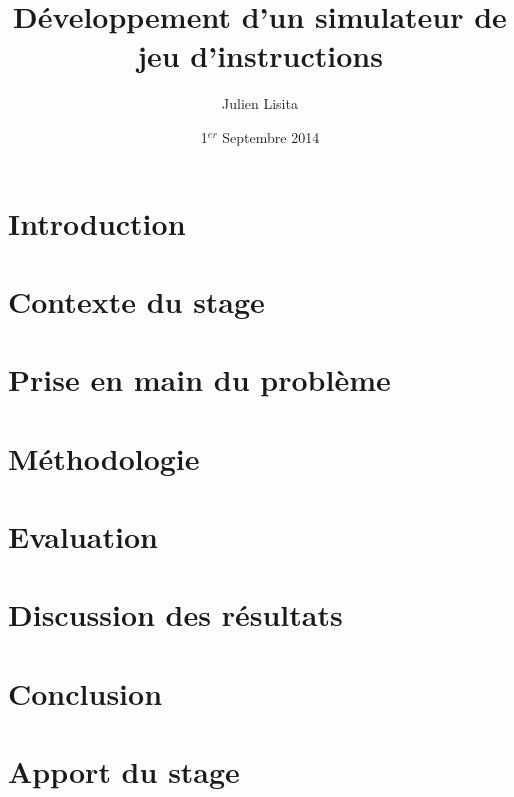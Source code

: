 \documentclass[a4paper,11pt,onecolumn]{mathese}
\begin{document}
\setlength{\parskip}{0.5em}%
\baselineskip 14pt


\title{\bf \huge Développement d'un simulateur de jeu d'instructions}
\author{Julien Lisita}
\date{1$^{er}$ Septembre 2014}

\begin{titlepage}
\begin{figure}
\begin{center}
\maketitle
\end{center}
\end{figure}
\end{titlepage}
%
%


\tableofcontents {}
\listoffigures

\mainmatter

\chapter{Introduction}
\label{introduction}

\chapter{Contexte du stage}
\chapter{Prise en main du problème}
\chapter{Méthodologie}
\chapter{Evaluation}
\chapter{Discussion des résultats}
\chapter{Conclusion}
\chapter{Apport du stage}

% 
%  



\end{document}
